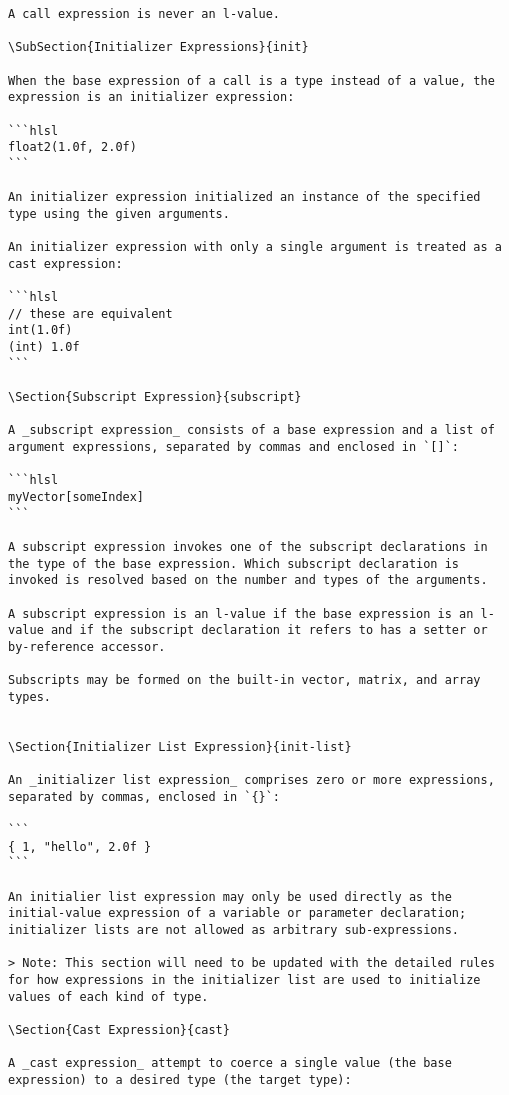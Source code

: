 \begin{verbatim}
A call expression is never an l-value.

\SubSection{Initializer Expressions}{init}

When the base expression of a call is a type instead of a value, the expression is an initializer expression:

```hlsl
float2(1.0f, 2.0f)
```

An initializer expression initialized an instance of the specified type using the given arguments.

An initializer expression with only a single argument is treated as a cast expression:

```hlsl
// these are equivalent
int(1.0f)
(int) 1.0f
```

\Section{Subscript Expression}{subscript}

A _subscript expression_ consists of a base expression and a list of argument expressions, separated by commas and enclosed in `[]`:

```hlsl
myVector[someIndex]
```

A subscript expression invokes one of the subscript declarations in the type of the base expression. Which subscript declaration is invoked is resolved based on the number and types of the arguments.

A subscript expression is an l-value if the base expression is an l-value and if the subscript declaration it refers to has a setter or by-reference accessor.

Subscripts may be formed on the built-in vector, matrix, and array types.


\Section{Initializer List Expression}{init-list}

An _initializer list expression_ comprises zero or more expressions, separated by commas, enclosed in `{}`:

```
{ 1, "hello", 2.0f }
```

An initialier list expression may only be used directly as the initial-value expression of a variable or parameter declaration; initializer lists are not allowed as arbitrary sub-expressions.

> Note: This section will need to be updated with the detailed rules for how expressions in the initializer list are used to initialize values of each kind of type.

\Section{Cast Expression}{cast}

A _cast expression_ attempt to coerce a single value (the base expression) to a desired type (the target type):


\end{verbatim}
